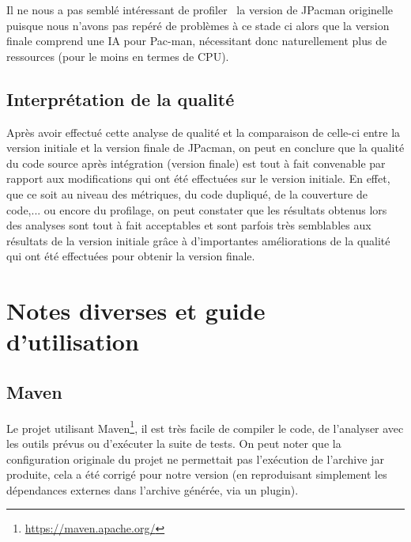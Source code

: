 \documentclass[12pt, openany]{report}
\begin{document}
Il ne nous a pas semblé intéressant de \og profiler \fg \, la version de JPacman originelle puisque nous n'avons pas repéré de problèmes à ce stade ci alors que la version finale comprend une IA pour Pac-man, nécessitant donc naturellement plus de ressources (pour le moins en termes de CPU).

\subsection{Interprétation de la qualité}

Après avoir effectué cette analyse de qualité et la comparaison de celle-ci entre la version initiale et la version finale de JPacman, on peut en conclure que la qualité du code source après intégration (version finale) est tout à fait convenable par rapport aux modifications qui ont été effectuées sur le version initiale. En effet, que ce soit au niveau des métriques, du code dupliqué, de la couverture de code,... ou encore du profilage, on peut constater que les résultats obtenus lors des analyses sont tout à fait acceptables et sont parfois très semblables aux résultats de la version initiale grâce à d'importantes améliorations de la qualité qui ont été effectuées pour obtenir la version finale.


\section{Notes diverses et guide d'utilisation}
\subsection{Maven}
Le projet utilisant Maven\footnote{\url{https://maven.apache.org/}}, il est très facile de compiler le code, de l'analyser avec les outils prévus ou d'exécuter la suite de tests.
On peut noter que la configuration originale du projet ne permettait pas l'exécution de l'archive jar produite, cela a été corrigé pour notre version (en reproduisant simplement les dépendances externes dans l'archive générée, via un plugin).
\end{document}
